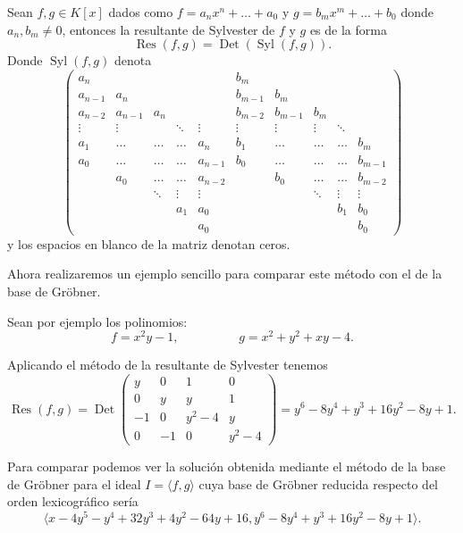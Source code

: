 \begin{definition}
	Sean $f, g \in K[x]$ dados como $f = a_n x^n + \dots + a_0$ y $g = b_m x^m + \dots + b_0$ donde $a_n, b_m \neq 0$, entonces la resultante de Sylvester de $f$ y $g$ es de la forma
$$\operatorname{Res}(f,g) = \operatorname{Det}(\operatorname{Syl}(f,g)).$$
Donde $\operatorname{Syl}(f,g)$ denota
	$$\begin{pmatrix}
	a_n & & & & & b_m & & & & \\
	a_{n-1} & a_n & & & & b_{m-1} & b_m & & & \\
	a_{n-2} & a_{n-1} & a_n & & & b_{m-2} & b_{m-1} & b_m & & \\
	\vdots & \vdots & & \ddots & \vdots & \vdots & \vdots & \vdots & \ddots & \\
	a_1 & \dotso & \dotso & \dotso & a_{n} & b_1 & \dotso & \dotso & \dotso & b_{m} \\
	a_0 & \dotso & \dotso & \dotso & a_{n-1} & b_0 & \dotso & \dotso & \dotso & b_{m-1} \\
	 & a_0 & \dotso & \dotso & a_{n-2} & & b_0 & \dotso & \dotso & b_{m-2} \\
	 & & \ddots & \vdots & \vdots & & & \ddots & \vdots & \vdots \\
	 & & & a_1 & a_0 & & & & b_1 & b_0 \\
	 & & & & a_0 & & & & & b_0
	\end{pmatrix}$$
y los espacios en blanco de la matriz denotan ceros.
\end{definition}

Ahora realizaremos un ejemplo sencillo para comparar este método con el de la base de Gröbner.

Sean por ejemplo los polinomios:
$$f = x^2 y - 1, \hspace{2cm} g = x^2 + y^2 + xy - 4.$$

Aplicando el método de la resultante de Sylvester tenemos
$$\operatorname{Res}(f,g) = \operatorname{Det} \begin{pmatrix}
y & 0 & 1 & 0 \\
0 & y & y & 1 \\
-1 & 0 & y^2 - 4 & y \\
0 & -1 & 0 & y^2 - 4
\end{pmatrix} = y^6 - 8y^4 + y^3 + 16y^2 - 8y + 1.$$

Para comparar podemos ver la solución obtenida mediante el método de la base de Gröbner para el ideal $I = \langle f,g \rangle$ cuya base de Gröbner reducida respecto del orden lexicográfico sería
$$\langle x - 4y^5- y^4 + 32y^3 + 4y^2 - 64y + 16 , y^6 - 8y^4 + y^3 + 16y^2 - 8y + 1 \rangle.$$

